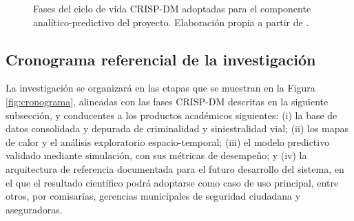 \documentclass[12pt,letterpaper]{report}
\begin{document}
\begin{figure}[H]
\centering
{}
\caption[Ciclo de vida CRISP-DM]{Fases del ciclo de vida CRISP-DM adoptadas para el componente anal\'itico-predictivo del proyecto. Elaboraci\'on propia a partir de \citet{crispdm2000}.}
\label{fig:crispdm}
\end{figure}

\subsection{Cronograma referencial de la investigaci\'on}
La investigaci\'on se organizar\'a en las etapas que se muestran en la Figura \ref{fig:cronograma}, alineadas con las fases CRISP-DM descritas en la siguiente subsecci\'on, y conducentes a los productos acad\'emicos siguientes: (i) la base de datos consolidada y depurada de criminalidad y siniestralidad vial; (ii) los mapas de calor y el an\'alisis exploratorio espacio-temporal; (iii) el modelo predictivo validado mediante simulaci\'on, con sus m\'etricas de desempe\~no; y (iv) la arquitectura de referencia documentada para el futuro desarrollo del sistema, en el que el resultado cient\'ifico podr\'a adoptarse como caso de uso principal, entre otros, por comisar\'ias, gerencias municipales de seguridad ciudadana y aseguradoras.
\end{document}
